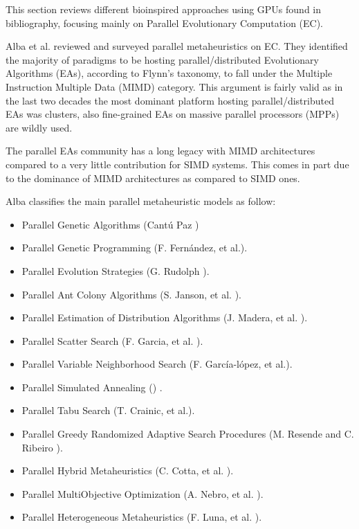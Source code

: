 \documentclass[prodmode,acmtecs]{acmsmall}
\begin{document}
This section reviews different bioinspired approaches using GPUs found in bibliography, focusing mainly on Parallel Evolutionary Computation (EC).

Alba et al. \cite{Alba2005book} reviewed and surveyed parallel metaheuristics on EC. They identified the majority of paradigms to be hosting parallel/distributed Evolutionary Algorithms (EAs), according to Flynn's taxonomy, to fall under the Multiple Instruction Multiple Data (MIMD) category. This argument is fairly valid as in the last two decades the most dominant platform hosting parallel/distributed EAs was clusters, also fine-grained EAs on massive parallel processors (MPPs) are wildly used.

The parallel EAs community has a long legacy with MIMD architectures compared to a very little contribution for SIMD systems. This comes in part due to the dominance of MIMD architectures as compared to SIMD ones.

Alba classifies the main parallel metaheuristic models as follow:
\begin{itemize}
\item Parallel Genetic Algorithms (Cant\'u Paz \cite{Cantu-Paz98asurvey}) %
\item Parallel Genetic Programming (F. Fernández, et al.\cite{springerlink:10.1023_A:1021873026259}).
\item Parallel Evolution Strategies (G. Rudolph \cite{Rudolph92parallelapproaches}).
\item Parallel Ant Colony Algorithms (S. Janson, et al. \cite{ParallelAntColony}).
\item Parallel Estimation of Distribution Algorithms (J. Madera, et al. \cite{springerlink:10.1007_3_540_32494_1_7}).
\item Parallel Scatter Search (F. Garcia, et al. \cite{GarciaLopez2003575}).
\item Parallel Variable Neighborhood Search (F. Garc\'ia-l\'opez, et al.\cite{Garcia_lopez_theparallel}).
\item Parallel Simulated Annealing (\cite{Genetic_parallelsimulated}) .
\item Parallel Tabu Search (T. Crainic, et al.\cite{Crainic97towardsa}).
\item Parallel Greedy Randomized Adaptive Search Procedures (M. Resende and C. Ribeiro \cite{Resendeparallelgreedy}).
\item Parallel Hybrid Metaheuristics (C. Cotta, et al. \cite{Cotta05e:parallel}). 
\item Parallel MultiObjective Optimization (A. Nebro, et al. \cite{Nebro07mocell:a}).
\item Parallel Heterogeneous Metaheuristics (F. Luna, et al. \cite{ANL04}). 
\end{itemize}
\end{document}
